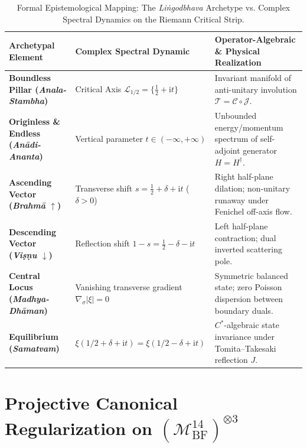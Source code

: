 \documentclass[11pt,a4paper,reqno]{article}
\theoremstyle{plain}
\theoremstyle{definition}
\theoremstyle{remark}
\numberwithin{equation}{section}
\newcommand{\Mbf}{\mathcal{M}_{\mathrm{BF}}^{14}}
\begin{document}
\begin{table}[htbp]
\centering
\caption{Formal Epistemological Mapping: The \emph{Li\.{n}godbhava} Archetype vs. Complex Spectral Dynamics on the Riemann Critical Strip.}
\label{tab:archetypal_mapping}
\footnotesize
\renewcommand{\arraystretch}{1.25}
\begin{tabularx}{\textwidth}{@{}P{3.8cm}P{4.2cm}Y@{}}
\toprule
\textbf{Archetypal Element} & \textbf{Complex Spectral Dynamic} & \textbf{Operator-Algebraic \& Physical Realization} \\
\midrule
\textbf{Boundless Pillar (\emph{Anala-Stambha})} & Critical Axis $\mathcal{L}_{1/2} = \{\frac{1}{2} + \mathrm{i}t\}$ & Invariant manifold of anti-unitary involution $\mathcal{T} = \mathcal{C} \circ \mathcal{J}$. \\
\textbf{Originless \& Endless (\emph{An\={a}di-Ananta})} & Vertical parameter $t \in (-\infty, +\infty)$ & Unbounded energy/momentum spectrum of self-adjoint generator $H = H^\dagger$. \\
\textbf{Ascending Vector (\emph{Brahm\={a}} $\uparrow$)} & Transverse shift $s = \frac{1}{2} + \delta + \mathrm{i}t$ ($\delta > 0$) & Right half-plane dilation; non-unitary runaway under Fenichel off-axis flow. \\
\textbf{Descending Vector (\emph{Vi\d{s}\d{n}u} $\downarrow$)} & Reflection shift $1 - s = \frac{1}{2} - \delta - \mathrm{i}t$ & Left half-plane contraction; dual inverted scattering pole. \\
\textbf{Central Locus (\emph{Madhya-Dh\={a}man})} & Vanishing transverse gradient $\nabla_\sigma |\xi| = 0$ & Symmetric balanced state; zero Poisson dispersion between boundary duals. \\
\textbf{Equilibrium (\emph{Samatvam})} & $\xi(1/2 + \delta + \mathrm{i}t) = \xi(1/2 - \delta + \mathrm{i}t)$ & $C^*$-algebraic state invariance under Tomita--Takesaki reflection $J$. \\
\bottomrule
\end{tabularx}
\end{table}

\section{Projective Canonical Regularization on \texorpdfstring{$(\Mbf)^{\otimes 3}$}{(M\_BF\textasciicircum 14)\textasciicircum 3}}
\label{sec:projective_regularization}
\end{document}
